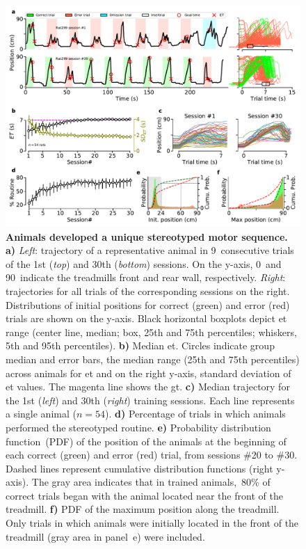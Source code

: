 \begin{figure}[bt!]
	\begin{center}
		\includegraphics[width=\textwidth]{ch-time/figures/CtrlTrd.pdf}
		\caption[Control Condition]
		{\textbf{Animals developed a unique stereotyped motor sequence.}
		\textbf{a)}
		\textit{Left}: trajectory of a representative animal in 9~consecutive trials of the 1st (\textit{top}) and 30th (\textit{bottom}) sessions.
		On the y-axis, 0~and 90~indicate the treadmills front and rear wall, respectively.
		\textit{Right}: trajectories for all trials of the corresponding sessions on the right.
		Distributions of initial positions for correct (green) and error (red) trials are shown on the y-axis.
		Black horizontal boxplots depict \gls{et} range (center line, median; box, 25th and 75th percentiles; whiskers, 5th and 95th percentiles).
		\textbf{b)}
		Median \gls{et}.
		Circles indicate group median and error bars, the median range (25th and 75th percentiles) across animals for \gls{et} and on the right y-axis, standard deviation of \gls{et} values.
		The magenta line shows the \gls{gt}.
		\textbf{c)}
		Median trajectory for the 1st (\textit{left}) and 30th (\textit{right}) training sessions.
		Each line represents a single animal ($n=54$).
		\textbf{d)}
		Percentage of trials in which animals performed the stereotyped routine.
		\textbf{e)}
		Probability distribution function~(PDF) of the position of the animals at the beginning of each correct (green) and error (red) trial, from sessions \#20 to \#30.
		Dashed lines represent cumulative distribution functions (right y-axis).
		The gray area indicates that in trained animals,~80\% of correct trials began with the animal located near the front of the treadmill.
		\textbf{f)}
		PDF of the maximum position along the treadmill.
		Only trials in which animals were initially located in the front of the treadmill (gray area in panel~e) were included.
		}
		\label{fig:time:CtrlTrd}
	\end{center}
  \end{figure}